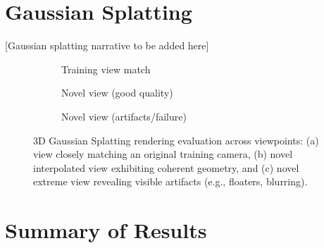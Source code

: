 \documentclass[12pt]{article}
\begin{document}
\section{Gaussian Splatting}\label{sec:gaussian_splatting}


[Gaussian splatting narrative to be added here]

\begin{figure}[!htbp]
\centering
\begin{subfigure}[b]{0.32\textwidth}
\centering
\fbox{\rule{0pt}{1.3in}\rule{0.95\textwidth}{0pt}}
\caption{Training view match}
\label{fig:splat_train}
\end{subfigure}\hfill
\begin{subfigure}[b]{0.32\textwidth}
\centering
\fbox{\rule{0pt}{1.3in}\rule{0.95\textwidth}{0pt}}
\caption{Novel view (good quality)}
\label{fig:splat_good}
\end{subfigure}\hfill
\begin{subfigure}[b]{0.32\textwidth}
\centering
\fbox{\rule{0pt}{1.3in}\rule{0.95\textwidth}{0pt}}
\caption{Novel view (artifacts/failure)}
\label{fig:splat_poor}
\end{subfigure}
\caption{3D Gaussian Splatting rendering evaluation across viewpoints: (a) view closely matching an original training camera, (b) novel interpolated view exhibiting coherent geometry, and (c) novel extreme view revealing visible artifacts (e.g., floaters, blurring).}
\label{fig:splat_renders}
\end{figure}


\section{Summary of Results}\label{sec:summary}
\end{document}
